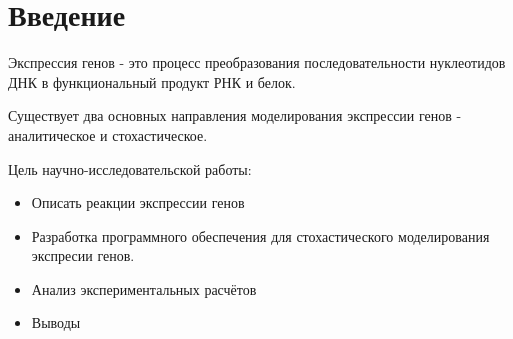\section*{Введение}
Экспрессия генов - это процесс преобразования последовательности нуклеотидов ДНК в функциональный продукт РНК и белок.

Существует два основных направления моделирования экспрессии генов - аналитическое и стохастическое.

Цель научно-исследовательской работы:
\begin{itemize}
    \item Описать реакции экспрессии генов
    \item Разработка программного обеспечения для стохастического моделирования
    экспресии генов.
    \item Анализ экспериментальных расчётов
    \item Выводы
\end{itemize}
